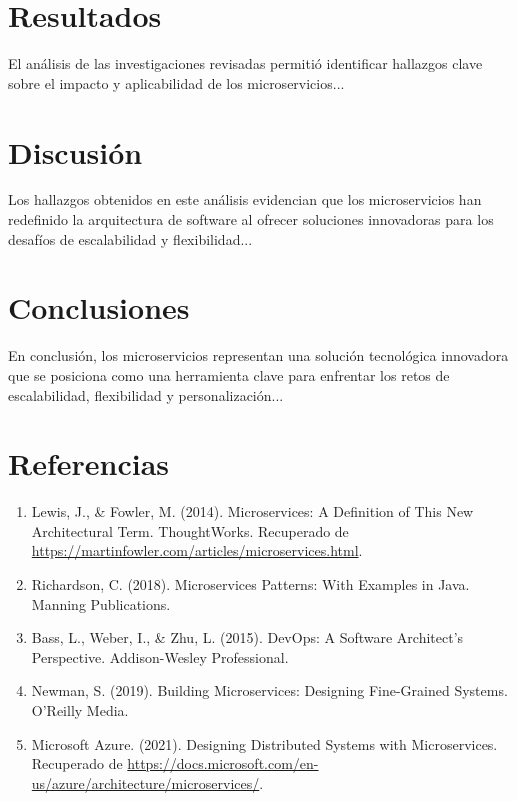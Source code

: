 \documentclass[12pt]{article}
\begin{document}
\section{Resultados}
El an\'alisis de las investigaciones revisadas permiti\'o identificar hallazgos clave sobre el impacto y aplicabilidad de los microservicios...

\section{Discusi\'on}
Los hallazgos obtenidos en este an\'alisis evidencian que los microservicios han redefinido la arquitectura de software al ofrecer soluciones innovadoras para los desaf\'ios de escalabilidad y flexibilidad...

\section{Conclusiones}
En conclusi\'on, los microservicios representan una soluci\'on tecnol\'ogica innovadora que se posiciona como una herramienta clave para enfrentar los retos de escalabilidad, flexibilidad y personalizaci\'on...

\section*{Referencias}
\begin{enumerate}
    \item Lewis, J., \& Fowler, M. (2014). Microservices: A Definition of This New Architectural Term. ThoughtWorks. Recuperado de \url{https://martinfowler.com/articles/microservices.html}.
    \item Richardson, C. (2018). Microservices Patterns: With Examples in Java. Manning Publications.
    \item Bass, L., Weber, I., \& Zhu, L. (2015). DevOps: A Software Architect's Perspective. Addison-Wesley Professional.
    \item Newman, S. (2019). Building Microservices: Designing Fine-Grained Systems. O'Reilly Media.
    \item Microsoft Azure. (2021). Designing Distributed Systems with Microservices. Recuperado de \url{https://docs.microsoft.com/en-us/azure/architecture/microservices/}.
\end{enumerate}
\end{document}
